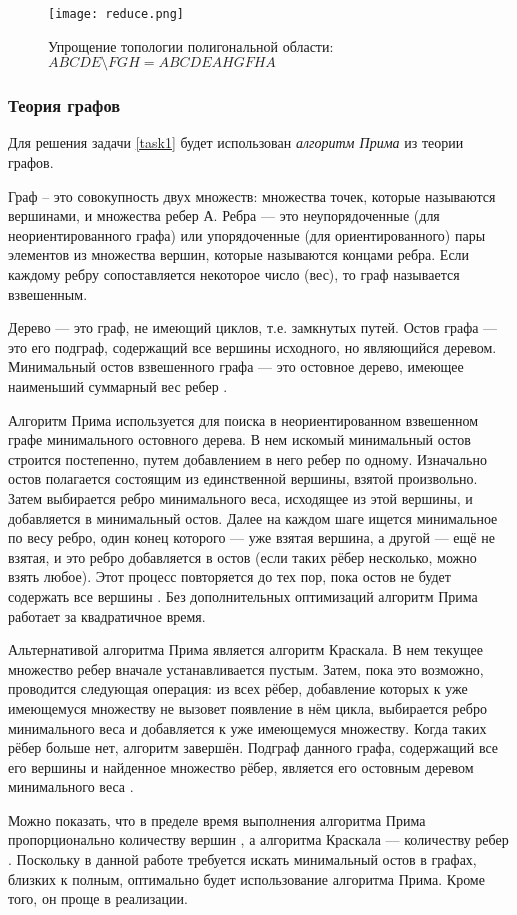 \begin{figure}[ht]
    \centering
    \texttt{[image: reduce.png]}
    \caption{Упрощение топологии полигональной области: $ABCDE \setminus FGH = ABCDEAHGFHA$}
    \label{fig:polysimp}
\end{figure}

\subsubsection{Теория графов}
\label{}

Для решения задачи \ref{task1} будет использован \textit{алгоритм Прима} из теории графов.

Граф – это совокупность двух множеств: множества точек, которые называются вершинами, и множества ребер А. Ребра --- это неупорядоченные (для неориентированного графа) или упорядоченные (для ориентированного) пары элементов из множества вершин, которые называются концами ребра. Если каждому ребру сопоставляется некоторое число (вес), то граф называется взвешенным. 

Дерево --- это граф, не имеющий циклов, т.е. замкнутых путей. Остов графа --- это его подграф, содержащий все вершины исходного, но являющийся деревом. Минимальный остов взвешенного графа --- это остовное дерево, имеющее наименьший суммарный вес ребер \cite{__2010}.

Алгоритм Прима используется для поиска в неориентированном взвешенном графе минимального остовного дерева. В нем искомый минимальный остов строится постепенно, путем добавлением в него ребер по одному. Изначально остов полагается состоящим из единственной вершины, взятой произвольно. Затем выбирается ребро минимального веса, исходящее из этой вершины, и добавляется в минимальный остов. Далее на каждом шаге ищется минимальное по весу ребро, один конец которого — уже взятая вершина, а другой — ещё не взятая, и это ребро добавляется в остов (если таких рёбер несколько, можно взять любое). Этот процесс повторяется до тех пор, пока остов не будет содержать все вершины \cite{prim_shortest_1957}. Без дополнительных оптимизаций алгоритм Прима работает за квадратичное время.

Альтернативой алгоритма Прима является алгоритм Краскала. В нем текущее множество ребер вначале устанавливается пустым. Затем, пока это возможно, проводится следующая операция: из всех рёбер, добавление которых к уже имеющемуся множеству не вызовет появление в нём цикла, выбирается ребро минимального веса и добавляется к уже имеющемуся множеству. Когда таких рёбер больше нет, алгоритм завершён. Подграф данного графа, содержащий все его вершины и найденное множество рёбер, является его остовным деревом минимального веса \cite{kruskal_shortest_1956}.

Можно показать, что в пределе время выполнения алгоритма Прима пропорционально количеству вершин \cite{prim_shortest_1957}, а алгоритма Краскала --- количеству ребер \cite{kruskal_shortest_1956}. Поскольку в данной работе требуется искать минимальный остов в графах, близких к полным, оптимально будет использование алгоритма Прима. Кроме того, он проще в реализации.